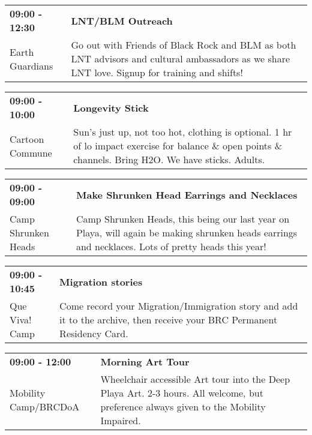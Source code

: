 \begin{tabular}{ p{1in} p{2.2in} }
    \textbf{09:00 - 12:30} & \textbf{LNT/BLM Outreach } \\
    Earth Guardians \newline  & Go out with Friends of Black Rock and BLM as both LNT advisors and cultural ambassadors as we share LNT love. Signup for training and shifts! \\
    \hline 
\end{tabular}
    
\begin{tabular}{ p{1in} p{2.2in} }
    \textbf{09:00 - 10:00} & \textbf{Longevity Stick} \\
    Cartoon Commune \newline  & Sun's just up, not too hot, clothing is optional. 1 hr of lo impact exercise for balance \& open points \& channels. Bring H2O. We have sticks. Adults. \\
    \hline 
\end{tabular}
    
\begin{tabular}{ p{1in} p{2.2in} }
    \textbf{09:00 - 09:00} & \textbf{Make Shrunken Head Earrings and Necklaces} \\
    Camp Shrunken Heads \newline  & Camp Shrunken Heads, this being our last year on Playa, will again be making shrunken heads earrings and necklaces. Lots of pretty heads this year! \\
    \hline 
\end{tabular}
    
\begin{tabular}{ p{1in} p{2.2in} }
    \textbf{09:00 - 10:45} & \textbf{Migration stories} \\
    Que Viva! Camp \newline  & Come record your Migration/Immigration story and add it to the archive, then receive your BRC Permanent Residency Card. \\
    \hline 
\end{tabular}
    
\begin{tabular}{ p{1in} p{2.2in} }
    \textbf{09:00 - 12:00} & \textbf{Morning Art Tour} \\
    Mobility Camp/BRCDoA \newline  & Wheelchair accessible Art tour into the Deep Playa Art.
2-3 hours. All welcome, but preference always given to the Mobility Impaired. \\
    \hline 
\end{tabular}
    
